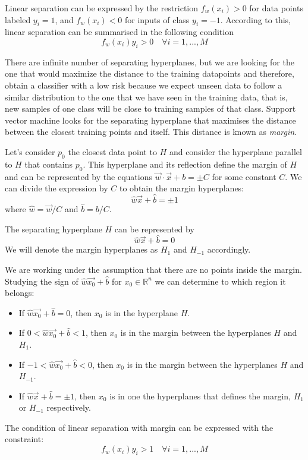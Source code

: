 Linear separation can be expressed by the restriction $f_w(x_i) >0$ for data points labeled $y_i = 1$, and $f_w(x_i)<0$ for inputs of class $y_i=-1$. According to this, linear separation can be summarised in the following condition 
$$f_w(x_i)y_i > 0 \quad \forall i=1,...,M$$

There are infinite number of separating hyperplanes, but we are looking for the one that would maximize the distance to the training datapoints and therefore, obtain a classifier with a low risk because we expect unseen data to follow a similar distribution to the one that we have seen in the training data, that is, new samples of one class will be close to training samples of that class. Support vector machine looks for the separating hyperplane that maximises the distance between the closest training points and itself. This distance is known as \textit{margin}.

Let's consider $p_0$ the closest data point to $H$ and consider the hyperplane parallel to $H$ that contains $p_0$. This hyperplane and its reflection define the margin of $H$ and can be represented by the equations $\vec{w}\cdot \vec{x} +b =\pm C$ for some constant $C$. We can divide the expression by $C$ to obtain the margin hyperplanes: $$\hat{w} \vec{x} + \hat{b} = \pm 1$$
where $\hat{w}=\vec{w}/C$ and $\hat{b}=b/C$.

The separating hyperplane $H$ can be represented by $$\hat{w} \vec{x} + \hat{b} = 0$$
We will denote the margin hyperplanes as $H_1$ and $H_{-1}$ accordingly.

We are working under the assumption that there are no points inside the margin. Studying the sign of $\hat{w} \vec{x_0} + \hat{b}$ for $x_0 \in \mathbb{R}^n$ we can determine to which region it belongs:
\begin{itemize}
    \item If $\hat{w} \vec{x_0} + \hat{b} = 0$, then $x_0$ is in the hyperplane $H$.
    \item If $0<\hat{w} \vec{x_0} + \hat{b}<1$, then $x_0$ is in the margin between the hyperplanes $H$ and $H_1$.
    \item If $-1<\hat{w} \vec{x_0} + \hat{b}<0$, then $x_0$ is in the margin between the hyperplanes $H$ and $H_{-1}$.
    \item If $\hat{w} \vec{x} + \hat{b} = \pm 1$, then $x_0$ is in one the hyperplanes that defines the margin, $H_1$ or $H_{-1} $ respectively.
\end{itemize}

The condition of linear separation with margin can be expressed with the constraint:
$$f_w(x_i)y_i>1 \quad \forall i=1,...,M$$

